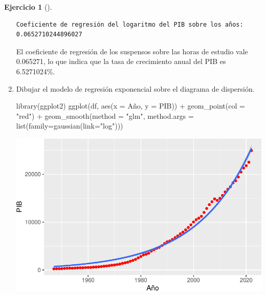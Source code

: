 \documentclass[
  a4paper,
]{scrreport}
\newenvironment{Shaded}{\begin{snugshade}}{\end{snugshade}}
\newcommand{\AttributeTok}[1]{\textcolor[rgb]{0.40,0.45,0.13}{#1}}
\newcommand{\FunctionTok}[1]{\textcolor[rgb]{0.28,0.35,0.67}{#1}}
\newcommand{\NormalTok}[1]{\textcolor[rgb]{0.00,0.23,0.31}{#1}}
\newcommand{\SpecialCharTok}[1]{\textcolor[rgb]{0.37,0.37,0.37}{#1}}
\newcommand{\StringTok}[1]{\textcolor[rgb]{0.13,0.47,0.30}{#1}}
\theoremstyle{definition}
\newtheorem{exercise}{Ejercicio}[chapter]
\theoremstyle{remark}
\begin{document}
\begin{exercise}[]
\begin{enumerate}
\begin{tcolorbox}
\begin{verbatim}
Coeficiente de regresión del logaritmo del PIB sobre los años: 0.0652710244896027
\end{verbatim}

  El coeficiente de regresión de los suspensos sobre las horas de
  estudio vale 0.065271, lo que indica que la tasa de crecimiento anual
  del PIB es 6.5271024\%.

  \end{tcolorbox}
\item
  Dibujar el modelo de regresión exponencial sobre el diagrama de
  dispersión.

  \begin{tcolorbox}[enhanced jigsaw, toprule=.15mm, rightrule=.15mm, arc=.35mm, colback=white, colbacktitle=quarto-callout-tip-color!10!white, toptitle=1mm, left=2mm, colframe=quarto-callout-tip-color-frame, opacityback=0, breakable, opacitybacktitle=0.6, bottomtitle=1mm, titlerule=0mm, title=\textcolor{quarto-callout-tip-color}{\faLightbulb}\hspace{0.5em}{Solución}, bottomrule=.15mm, coltitle=black, leftrule=.75mm]

\begin{Shaded}
\begin{Highlighting}[]
\FunctionTok{library}\NormalTok{(ggplot2)}
\FunctionTok{ggplot}\NormalTok{(df, }\FunctionTok{aes}\NormalTok{(}\AttributeTok{x =}\NormalTok{ Año, }\AttributeTok{y =}\NormalTok{ PIB)) }\SpecialCharTok{+}
        \FunctionTok{geom\_point}\NormalTok{(}\AttributeTok{col =} \StringTok{"red"}\NormalTok{) }\SpecialCharTok{+}
        \FunctionTok{geom\_smooth}\NormalTok{(}\AttributeTok{method =} \StringTok{"glm"}\NormalTok{, }\AttributeTok{method.args =} \FunctionTok{list}\NormalTok{(}\AttributeTok{family=}\FunctionTok{gaussian}\NormalTok{(}\AttributeTok{link=}\StringTok{"log"}\NormalTok{)))}
\end{Highlighting}
\end{Shaded}

  \includegraphics{05-regresion_files/figure-pdf/unnamed-chunk-29-1.pdf}


\end{tcolorbox}
\end{enumerate}
\end{exercise}
\end{document}
